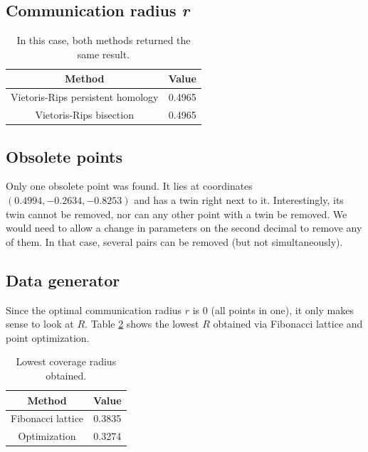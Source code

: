 \documentclass[twocolumn]{article}
\begin{document}
\subsection{Communication radius \textit{r}}
\begin{table}[h]
    \centering
    \begin{tabular}{c|c}
        Method & Value  \\
        \hline
         Vietoris-Rips persistent homology & 0.4965 \\
         Vietoris-Rips bisection & 0.4965 \\
    \end{tabular}
    \caption{In this case, both methods returned the same result.}
    \label{tab:r}
\end{table}

\subsection{Obsolete points}
Only one obsolete point was found. It lies at coordinates $(0.4994, -0.2634, -0.8253)$ and has a twin right next to it. Interestingly, its twin cannot be removed, nor can any other point with a twin be removed. We would need to allow a change in parameters on the second decimal to remove any of them. In that case, several pairs can be removed (but not simultaneously).

\subsection{Data generator}
Since the optimal communication radius $r$ is $0$ (all points in one), it only makes sense to look at $R$. Table \ref{tab:generator} shows the lowest $R$ obtained via Fibonacci lattice and point optimization.

\begin{table}[h]
    \centering
    \begin{tabular}{c|c}
        Method & Value  \\
        \hline
         Fibonacci lattice & 0.3835 \\
         Optimization & 0.3274 \\
    \end{tabular}
    \caption{Lowest coverage radius obtained.}
    \label{tab:generator}
\end{table}
\end{document}
